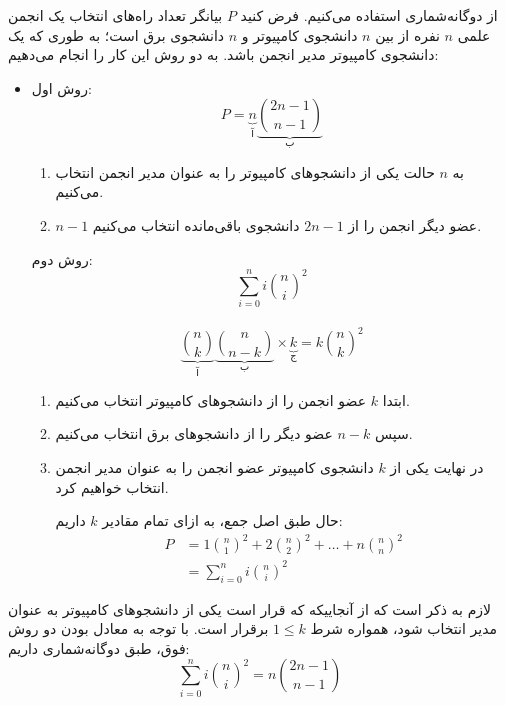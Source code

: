         \p
        از دوگانه‌شماری استفاده می‌کنیم.
        فرض کنید
        $P$
        بیانگر تعداد راه‌های انتخاب یک انجمن علمی
        $n$
        نفره از بین
        $n$
        دانشجوی کامپیوتر و 
        $n$
        دانشجوی برق است؛ 
        به طوری که یک دانشجوی کامپیوتر مدیر انجمن ‌باشد.
        به دو روش این کار را انجام می‌دهیم:
        \begin{itemize}
        \item 
        روش اول:
        $$P = \underbrace{n}_{\text{آ}} \underbrace{\binom{2n-1}{n-1}}_{\text{ب}}$$
        \begin{enumerate}
        \item 
        به 
        $n$
        حالت 
        یکی از دانشجو‌های کامپیوتر را به عنوان مدیر انجمن انتخاب می‌کنیم.
        \item  
        $n-1$
        عضو دیگر انجمن را از
        $2n-1$
        دانشجوی باقی‌مانده انتخاب می‌کنیم.
       
        \end{enumerate}
        روش دوم:
        $$\sum\limits_{i=0}^{n} i {\binom{n}{i}}^2$$\\
        $$\underbrace{\binom{n}{k}}_{\text{آ}} \underbrace{\binom{n}{n-k}}_{\text{ب}} \times \underbrace{k}_{\text{ج}}  = k{\binom{n}{k}}^2$$
        \begin{enumerate}             
        \item 
        ابتدا 
        $k$
        عضو انجمن را از دانشجو‌های کامپیوتر 
        انتخاب می‌کنیم.
        \item 
        سپس
        $n-k$
        عضو دیگر را از دانشجو‌های برق انتخاب می‌کنیم.
        \item 
        در نهایت یکی از
        $k$
        دانشجوی کامپیوتر عضو انجمن را به عنوان مدیر انجمن انتخاب خواهیم کرد.
       
        حال طبق اصل جمع، به ازای تمام مقادیر    
        $k$
        داریم: 
        \begin{align*}
        P &= 1{\binom{n}{1}}^2 + 2{\binom{n}{2}}^2 + \ldots + n{\binom{n}{n}}^2\\
        &= \sum\limits_{i=0}^{n} i {\binom{n}{i}}^2
        \end{align*}
        \end{enumerate}
        \end{itemize} 
        لازم به ذکر است که از آنجاییکه که قرار است یکی از دانشجو‌های کامپیوتر به عنوان مدیر انتخاب شود، همواره شرط 
        $1\leq k$
        برقرار است.
        \p
        با توجه به معادل بودن دو روش فوق، طبق دوگانه‌شماری داریم:
        $$ \sum\limits_{i=0}^{n} i {\binom{n}{i}}^2 = n\binom{2n-1}{n-1}$$